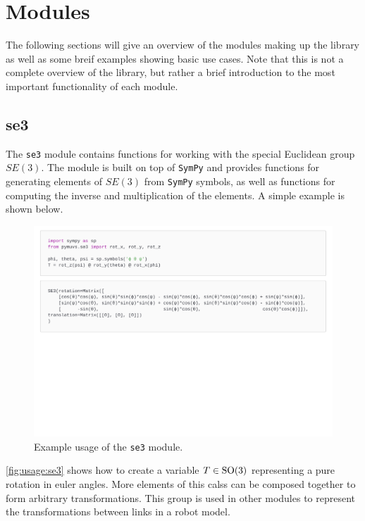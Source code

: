 \section{Modules}
The following sections will give an overview of the modules making up the
library as well as some breif examples showing basic use cases. Note that this
is not a complete overview of the library, but rather a brief introduction to
the most important functionality of each module.

\subsection{se3}
The \texttt{se3} module contains functions for working with the special Euclidean
group $SE(3)$. The module is built on top of \texttt{SymPy} and provides functions for
generating elements of $SE(3)$ from \texttt{SymPy} symbols, as well as functions
for computing the inverse and multiplication of the elements. A simple example
is shown below.

\begin{figure}[h]
    \centering
    \includegraphics[page=1,width=\linewidth,trim=0 11cm 0 0]{assets/se3.pdf}
    \caption{Example usage of the \texttt{se3} module.}
    \label{fig:usage:se3}
\end{figure}

\autoref{fig:usage:se3} shows how to create a variable $T \in \operatorname{SO}(3)$ representing
a pure rotation in euler angles. More elements of this calss can be composed
together to form arbitrary transformations. This group is used in other modules
to represent the transformations between links in a robot model.

